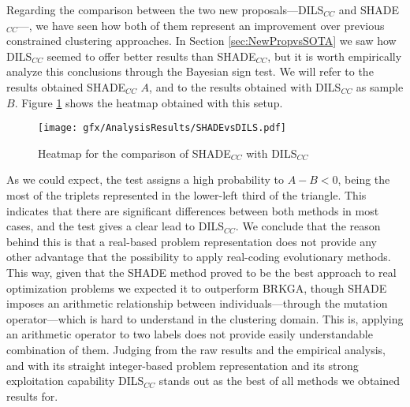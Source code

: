 Regarding the comparison between the two new proposals---\acs{DILS}$_{CC}$ and \acs{SHADE}$_{CC}$---, we have seen how both of them represent an improvement over previous constrained clustering approaches. In Section \ref{sec:NewPropvsSOTA} we saw how \acs{DILS}$_{CC}$ seemed to offer better results than \acs{SHADE}$_{CC}$, but it is worth empirically analyze this conclusions through the Bayesian sign test. We will refer to the results obtained \acs{SHADE}$_{CC}$ $A$, and to the results obtained with \acs{DILS}$_{CC}$ as sample $B$. Figure \ref{fig:SHADEvsDILS} shows the heatmap obtained with this setup.

\begin{figure}[!h]
	\centering
	\texttt{[image: gfx/AnalysisResults/SHADEvsDILS.pdf]}
	\caption[Heatmap for the comparison of SHADE$_{CC}$ with DILS$_{CC}$]{Heatmap for the comparison of \acs{SHADE}$_{CC}$ with \acs{DILS}$_{CC}$}\label{fig:SHADEvsDILS}
\end{figure}

As we could expect, the test assigns a high probability to $A - B < 0$, being the most of the triplets represented in the lower-left third of the triangle. This indicates that there are significant differences between both methods in most cases, and the test gives a clear lead to \acs{DILS}$_{CC}$. We conclude that the reason behind this is that a real-based problem representation does not provide any other advantage that the possibility to apply real-coding evolutionary methods. This way, given that the \acs{SHADE} method proved to be the best approach to real optimization problems we expected it to outperform \acs{BRKGA}, though \acs{SHADE} imposes an arithmetic relationship between individuals---through the mutation operator---which is hard to understand in the clustering domain. This is, applying an arithmetic operator to two labels does not provide easily understandable combination of them. Judging from the raw results and the empirical analysis, and with its straight integer-based problem representation and its strong exploitation capability \acs{DILS}$_{CC}$ stands out as the best of all methods we obtained results for.









